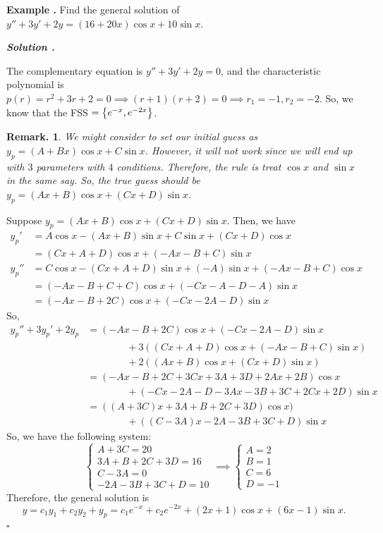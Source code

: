 \documentclass[12pt, a4paper]{article}
\newcounter{index}[subsection]
\newenvironment*{eg}{\begin{framed}\par\noindent\textbf{Example \thesubsection.\stepcounter{index}\theindex}}{\par\end{framed}}
\newcounter{nprf}[subsection]
\newenvironment*{sol}{\par\indent\textbf{\textit{Solution \stepcounter{nprf}\thenprf.}}\par}{\hfill{$\square$}\par}
\newtheorem*{rmk}{Remark.}
\def\C{{\mathbb{C}}}
\begin{document}
\begin{eg}
	Find the general solution of $y''+3y'+2y=(16+20x)\cos{x}+10\sin{x}$.
	\begin{sol}
		The complementary equation is $y''+3y'+2y=0$, and the characteristic polynomial is $p(r)=r^2+3r+2=0\implies(r+1)(r+2)=0\implies r_1=-1,r_2=-2$. So, we know that the FSS $=\qty{e^{-x},e^{-2x}}$. 
		\begin{rmk}
			We might consider to set our initial guess as $y_p=(A+Bx)\cos{x}+C\sin{x}$. However, it will not work since we will end up with $3$ parameters with $4$ conditions. Therefore, the rule is treat $\cos{x}$ and $\sin{x}$ in the same say. So, the true guess should be $y_p=(Ax+B)\cos{x}+(Cx+D)\sin{x}$.
		\end{rmk}
		Suppose  $y_p=(Ax+B)\cos{x}+(Cx+D)\sin{x}$. Then, we have \begin{align*}y_p'&=A\cos{x}-(Ax+B)\sin{x}+C\sin{x}+(Cx+D)\cos{x}\\&=(Cx+A+D)\cos{x}+(-Ax-B+C)\sin{x}\\y_p''&=C\cos{x}-(Cx+A+D)\sin{x}+(-A)\sin{x}+(-Ax-B+C)\cos{x}\\&=(-Ax-B+C+C)\cos{x}+(-Cx-A-D-A)\sin{x}\\&=(-Ax-B+2C)\cos{x}+(-Cx-2A-D)\sin{x}\end{align*} So, \begin{align*}y_p''+3y_p'+2y_p&=(-Ax-B+2C)\cos{x}+(-Cx-2A-D)\sin{x}\\&\qquad\qquad+3((Cx+A+D)\cos{x}+(-Ax-B+C)\sin{x})\\&\qquad\qquad+2((Ax+B)\cos{x}+(Cx+D)\sin{x})\\&=(-Ax-B+2C+3Cx+3A+3D+2Ax+2B)\cos{x}\\&\qquad\qquad+(-Cx-2A-D-3Ax-3B+3C+2Cx+2D)\sin{x}\\&=((A+3C)x+3A+B+2C+3D)\cos{x})\\&\qquad\qquad+((C-3A)x-2A-3B+3C+D)\sin{x}\end{align*} So, we have the following system: \[\begin{cases}A+3C=20\\3A+B+2C+3D=16\\C-3A=0\\-2A-3B+3C+D=10\end{cases}\implies\begin{cases}A=2\\B=1\\C=6\\D=-1\end{cases}\] Therefore, the general solution is \[y=c_1y_1+c_2y_2+y_p=c_1e^{-x}+c_2e^{-2x}+(2x+1)\cos{x}+(6x-1)\sin{x}.\]
	\end{sol}
\end{eg}
\end{document}
